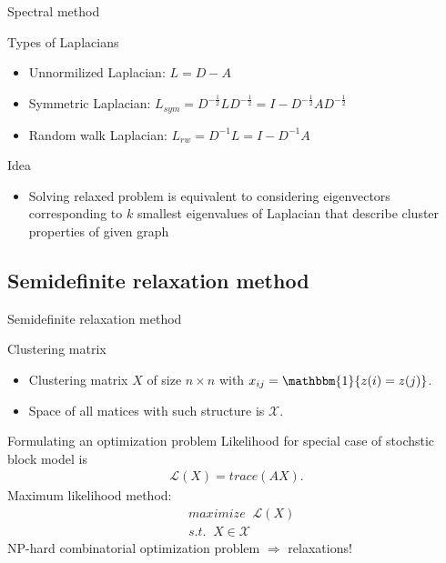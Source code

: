 \documentclass{beamer}
\theoremstyle{definition}
\theoremstyle{plain}
\theoremstyle{remark}
\begin{document}
		 	\begin{frame}{Spectral method}
				\begin{block}{Types of Laplacians}
					\begin{itemize}
						\item Unnormilized Laplacian: $L=D-A$
						\item Symmetric Laplacian: $L_{sym} =D^{-\frac{1}{2}}LD^{-\frac{1}{2}}=I-D^{-\frac{1}{2}}AD^{-\frac{1}{2}}$
						\item Random walk Laplacian: $L_{rw} =D^{-1}L=I-D^{-1}A$
					\end{itemize}
				\end{block}

				\begin{block}{Idea}
					\begin{itemize}
						\item Solving relaxed problem is equivalent to considering eigenvectors corresponding to $k$ smallest eigenvalues of Laplacian that describe cluster properties of given graph
					\end{itemize}
				\end{block}
				
			\end{frame}	
		
		\subsection{Semidefinite relaxation method}
			\begin{frame}{Semidefinite relaxation method}
				\begin{block}{Clustering matrix}
				\begin{itemize}
					\item Clustering matrix $X$ of size $n\times n$ with $x_{ij} = \mathbbm{1}\{ z(i) = z(j) \}$.\\
					\item Space of all matices with such structure is $\mathcal{X}$.
				\end{itemize}
				\end{block}
				
				\begin{block}{Formulating an optimization problem}
				Likelihood for special case of stochstic block model is
				\begin{equation}
					\begin{aligned}
						\mathcal{L}(X) = trace(AX).
					\nonumber
					\end{aligned}
				\end{equation}
				Maximum likelihood method:
				\begin{equation}
					\begin{aligned}
						&maximize\;\;\mathcal{L}(X)\\
						&s.t. \;\;X \in \mathcal{X}
					\nonumber
					\end{aligned}
				\end{equation}
				NP-hard combinatorial optimization problem $\Rightarrow$ relaxations!
				\end{block}
			\end{frame}
\end{document}
